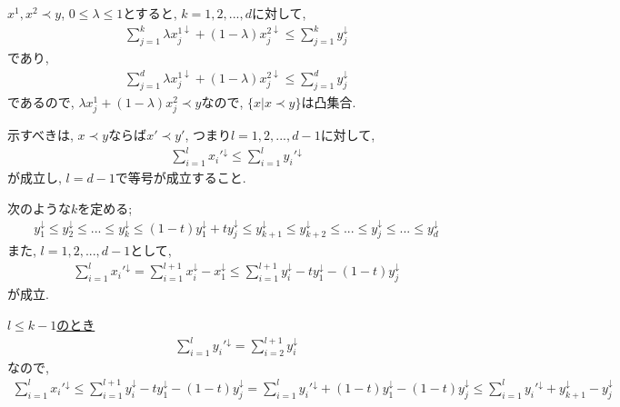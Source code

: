 \begin{ex}
    \label{ex12.18}
    $x^1 , x^2 \prec y$, $ 0 \le \lambda \le 1$とすると,
    $k = 1, 2, ..., d$に対して,
    \begin{align*}
        \sum_{j=1}^k \lambda x_j^{1 \downarrow} + (1-\lambda) x_j^{2 \downarrow}
        \le
        \sum_{j=1}^k y_j^\downarrow
    \end{align*}
    であり,
    \begin{align*}
        \sum_{j=1}^d \lambda x_j^{1 \downarrow} + (1-\lambda) x_j^{2 \downarrow}\le
        \sum_{j=1}^d y_j^\downarrow
    \end{align*}
    であるので, $\lambda x_j^{1} + (1-\lambda) x_j^{2} \prec y$なので, $\{x | x \prec y\}$は凸集合.
\end{ex}

\begin{ex}
    \label{ex12.19}
    示すべきは, $x \prec y$ならば$x' \prec y'$, つまり$l = 1,2, ..., d-1$に対して,
    \begin{align*}
        \sum_{i=1}^l x_i'^\downarrow
        \le
        \sum_{i=1}^l y_i'^\downarrow
    \end{align*}
    が成立し, $l = d-1$で等号が成立すること.
    \par
    次のような$k$を定める;
    \begin{align*}
        y_1^\downarrow \le y_2^\downarrow \le ... \le y_k^\downarrow \le (1-t) y_1^\downarrow + t y_j^\downarrow \le y_{k+1}^\downarrow \le y_{k+2}^\downarrow \le ... \le y_{j}^\downarrow
        \le ... \le y_d^\downarrow
    \end{align*}
    また, $l = 1,2, ..., d-1$として,
    \begin{align*}
        \sum_{i=1}^l x_i'^\downarrow
        =
        \sum_{i=1}^{l+1} x_i^\downarrow - x_1^\downarrow
        \le
        \sum_{i=1}^{l+1} y_i^\downarrow - t y_1^\downarrow - (1-t)y_j^\downarrow
    \end{align*}
    が成立.
    \par
    \underline{$l \le k -1 $のとき}\
    \begin{align*}
        \sum_{i=1}^l y_i'^\downarrow = \sum_{i=2}^{l+1} y_i^\downarrow
    \end{align*}
    なので,
    \begin{align*}
        \sum_{i=1}^l x_i'^\downarrow
        \le
        \sum_{i=1}^{l+1} y_i^\downarrow - t y_1^\downarrow - (1-t)y_j^\downarrow
        =
        \sum_{i=1}^l y_i'^\downarrow + (1-t)y_1^\downarrow - (1-t)y_j^\downarrow
        \le
        \sum_{i=1}^l y_i'^\downarrow +  y_{k+1}^\downarrow - y_j^\downarrow

\end{align*}
\end{ex}
